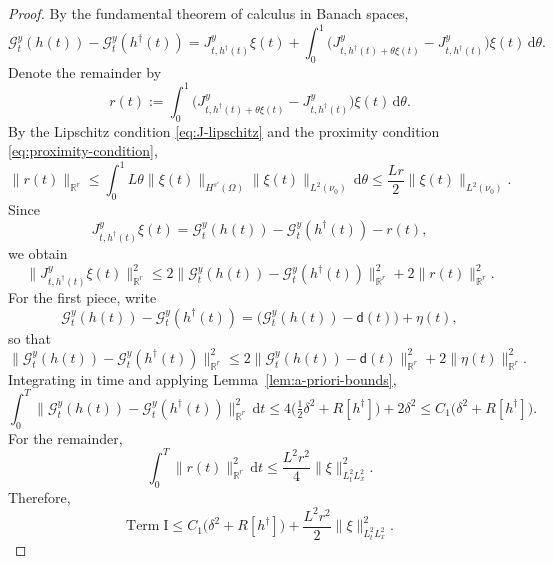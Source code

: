 \documentclass[10pt,a4paper]{amsart}
\newcommand{\obsdata}{\mathsf{d}}
\renewcommand{\d}{\mathrm{d}}
\begin{document}
\begin{proof}
    By the fundamental theorem of calculus in Banach spaces,
    \[
        \mathcal G_t^y(h(t))-\mathcal G_t^y(h^\dagger(t))
        =
        J_{t,h^\dagger(t)}^{y}\xi(t)
        +
        \int_0^1
        \bigl(J_{t,h^\dagger(t)+\theta\xi(t)}^{y}-J_{t,h^\dagger(t)}^{y}\bigr)\xi(t)\,\d\theta.
    \]
    Denote the remainder by
    \[
        r(t)
        :=
        \int_0^1
        \bigl(J_{t,h^\dagger(t)+\theta\xi(t)}^{y}-J_{t,h^\dagger(t)}^{y}\bigr)\xi(t)\,\d\theta.
    \]
    By the Lipschitz condition \eqref{eq:J-lipschitz} and the proximity condition
    \eqref{eq:proximity-condition},
    \[
        \|r(t)\|_{\mathbb R^r}
        \le
        \int_0^1
        L\theta\|\xi(t)\|_{H^{s'}(\Omega)}\|\xi(t)\|_{L^2(\nu_0)}\,\d\theta
        \le
        \frac{Lr}{2}\|\xi(t)\|_{L^2(\nu_0)}.
    \]
    Since
    \[
        J_{t,h^\dagger(t)}^{y}\xi(t)
        =
        \mathcal G_t^y(h(t))-\mathcal G_t^y(h^\dagger(t))-r(t),
    \]
    we obtain
    \[
        \|J_{t,h^\dagger(t)}^{y}\xi(t)\|_{\mathbb R^r}^2
        \le
        2\|\mathcal G_t^y(h(t))-\mathcal G_t^y(h^\dagger(t))\|_{\mathbb R^r}^2
        +
        2\|r(t)\|_{\mathbb R^r}^2.
    \]
    For the first piece, write
    \[
        \mathcal G_t^y(h(t))-\mathcal G_t^y(h^\dagger(t))
        =
        \bigl(\mathcal G_t^y(h(t))-\obsdata(t)\bigr)+\eta(t),
    \]
    so that
    \[
        \|\mathcal G_t^y(h(t))-\mathcal G_t^y(h^\dagger(t))\|_{\mathbb R^r}^2
        \le
        2\|\mathcal G_t^y(h(t))-\obsdata(t)\|_{\mathbb R^r}^2+2\|\eta(t)\|_{\mathbb R^r}^2.
    \]
    Integrating in time and applying Lemma~\ref{lem:a-priori-bounds},
    \[
        \int_0^T \|\mathcal G_t^y(h(t))-\mathcal G_t^y(h^\dagger(t))\|_{\mathbb R^r}^2\,\d t
        \le
        4\bigl(\tfrac12\delta^2+R[h^\dagger]\bigr)+2\delta^2
        \le
        C_1\bigl(\delta^2+R[h^\dagger]\bigr).
    \]
    For the remainder,
    \[
        \int_0^T \|r(t)\|_{\mathbb R^r}^2\,\d t
        \le
        \frac{L^2 r^2}{4}\|\xi\|_{L^2_tL^2_x}^2.
    \]
    Therefore,
    \begin{equation}
        \label{eq:stab-term-I-bound}
        \mathrm{Term\;I}
        \le
        C_1\bigl(\delta^2+R[h^\dagger]\bigr)
        +
        \frac{L^2 r^2}{2}\|\xi\|_{L^2_tL^2_x}^2.
    \end{equation}


\end{proof}
\end{document}
